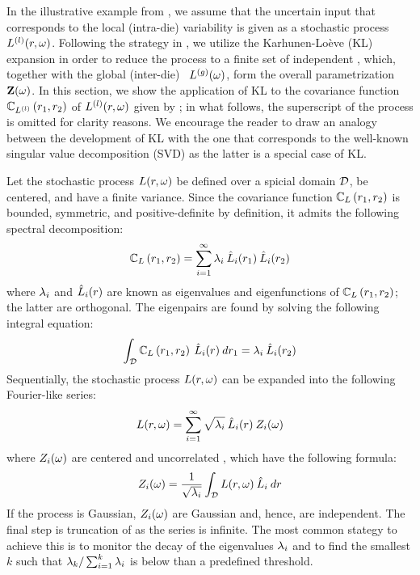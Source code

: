 In the illustrative example from , we assume that the uncertain input that corresponds to the local (intra-die) variability is given as a stochastic process $L^{(l)}(r, \omega)$. Following the strategy in , we utilize the Karhunen-Lo\`{e}ve (KL) expansion in order to reduce the process to a finite set of independent \rvs, which, together with the global (inter-die) \rv\ ${L^{(g)}}(\omega)$, form the overall parametrization $\mathbf{Z}(\omega)$. In this section, we show the application of KL to the covariance function $\mathbb{C}_{L^{(l)}}\left(r_1, r_2\right)$ of $L^{(l)}(r, \omega)$ given by  \cite{maitre2010, ghanem1991, ghanta2006}; in what follows, the superscript of the process is omitted for clarity reasons. We encourage the reader to draw an analogy between the development of KL with the one that corresponds to the well-known singular value decomposition (SVD) as the latter is a special case of KL.

Let the stochastic process $L(r, \omega)$ be defined over a spicial domain $\mathcal{D}$, be centered, and have a finite variance. Since the covariance function $\mathbb{C}_{L}\left(r_1, r_2\right)$ is bounded, symmetric, and positive-definite by definition, it admits the following spectral decomposition:
\[
  \mathbb{C}_{L}\left(r_1, r_2\right) = \sum_{i = 1}^\infty \lambda_i \: \hat{L}_i(r_1) \: \hat{L}_i(r_2)
\]
where $\lambda_i$ and $\hat{L}_i(r)$ are known as eigenvalues and eigenfunctions of $\mathbb{C}_{L}\left(r_1, r_2\right)$; the latter are orthogonal. The eigenpairs are found by solving the following integral equation:
\begin{equation} \elabel{kl-eigenpairs}
  \int_\domain \fCov{\Leff}{r_1, r_2} \: \klf{\Leff}_i (r) \: dr_1 = \klv_i \: \klf{\Leff}_i(r_2)
\end{equation}
Sequentially, the stochastic process $L(r, \omega)$ can be expanded into the following Fourier-like series:
\begin{equation} \elabel{kl-expansion}
  \Leff(r, \o) = \sum_{i = 1}^\infty \sqrt{\lambda_i} \: \pcc{\Leff}_i(r) \: \Z_i(\o)
\end{equation}
where $Z_i(\omega)$ are centered and uncorrelated \rvs, which have the following formula:
\[
  Z_i(\omega) = \frac{1}{\sqrt{\lambda_i}} \int_{\mathcal{D}} L(r, \omega) \: \hat{L}_i \: dr
\]
If the process is Gaussian, $Z_i(\omega)$ are Gaussian and, hence, are independent. The final step is truncation of  as the series is infinite. The most common stategy to achieve this is to monitor the decay of the eigenvalues $\lambda_i$ and to find the smallest $k$ such that $\lambda_k / \sum_{i = 1}^k \lambda_i$ is below than a predefined threshold.

